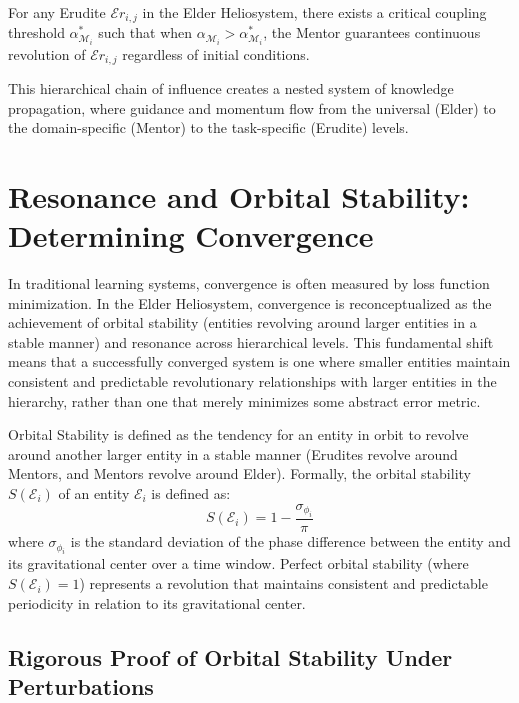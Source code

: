 \begin{corollary}
For any Erudite $\mathcal{E}r_{i,j}$ in the Elder Heliosystem, there exists a critical coupling threshold $\alpha_{\mathcal{M}_i}^*$ such that when $\alpha_{\mathcal{M}_i} > \alpha_{\mathcal{M}_i}^*$, the Mentor guarantees continuous revolution of $\mathcal{E}r_{i,j}$ regardless of initial conditions.
\end{corollary}

This hierarchical chain of influence creates a nested system of knowledge propagation, where guidance and momentum flow from the universal (Elder) to the domain-specific (Mentor) to the task-specific (Erudite) levels.

\section{Resonance and Orbital Stability: Determining Convergence}

In traditional learning systems, convergence is often measured by loss function minimization. In the Elder Heliosystem, convergence is reconceptualized as the achievement of orbital stability (entities revolving around larger entities in a stable manner) and resonance across hierarchical levels. This fundamental shift means that a successfully converged system is one where smaller entities maintain consistent and predictable revolutionary relationships with larger entities in the hierarchy, rather than one that merely minimizes some abstract error metric.

\begin{definition}
Orbital Stability is defined as the tendency for an entity in orbit to revolve around another larger entity in a stable manner (Erudites revolve around Mentors, and Mentors revolve around Elder). Formally, the orbital stability $S(\mathcal{E}_i)$ of an entity $\mathcal{E}_i$ is defined as:
\begin{equation}
S(\mathcal{E}_i) = 1 - \frac{\sigma_{\phi_i}}{\pi}
\end{equation}
where $\sigma_{\phi_i}$ is the standard deviation of the phase difference between the entity and its gravitational center over a time window. Perfect orbital stability (where $S(\mathcal{E}_i) = 1$) represents a revolution that maintains consistent and predictable periodicity in relation to its gravitational center.
\end{definition}

\subsection{Rigorous Proof of Orbital Stability Under Perturbations}

